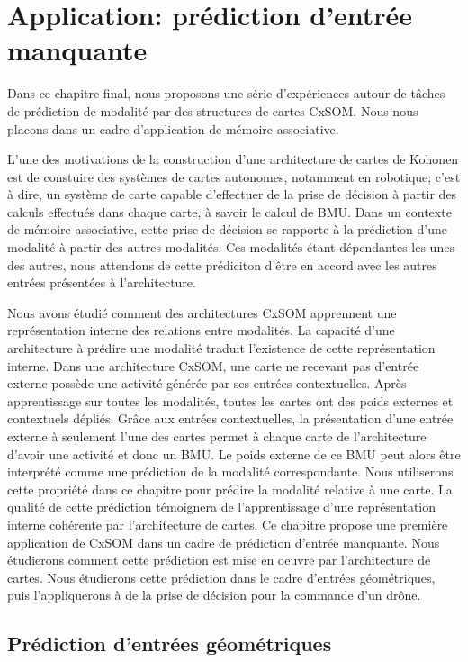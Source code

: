 \chapter{Application: prédiction d'entrée manquante}
\graphicspath{{07-Application/}}
\minitoc

Dans ce chapitre final, nous proposons une série d'expériences autour de tâches de prédiction de modalité par des structures de cartes CxSOM.
Nous nous placons dans un cadre d'application de mémoire associative.

L'une des motivations de la construction d'une architecture de cartes de Kohonen est de constuire des systèmes de cartes autonomes, notamment en robotique; c'est à dire, un système de carte capable d'effectuer de la prise de décision à partir des calculs effectués dans chaque carte, à savoir le calcul de BMU.
Dans un contexte de mémoire associative, cette prise de décision se rapporte à la prédiction d'une modalité à partir des autres modalités. Ces modalités étant dépendantes les unes des autres, nous attendons de cette prédiciton d'être en accord avec les autres entrées présentées à l'architecture.

Nous avons étudié comment des architectures CxSOM apprennent une représentation interne des relations entre modalités.
La capacité d'une architecture à prédire une modalité traduit l'existence de cette représentation interne.
Dans une architecture CxSOM, une carte ne recevant pas d'entrée externe possède une activité générée par ses entrées contextuelles.
Après apprentissage sur toutes les modalités, toutes les cartes ont des poids externes et contextuels dépliés.
Grâce aux entrées contextuelles, la présentation d'une entrée externe à seulement l'une des cartes permet à chaque carte de l'architecture d'avoir une activité et donc un BMU. Le poids externe de ce BMU peut alors être interprété comme une prédiction de la modalité correspondante.
Nous utiliserons cette propriété dans ce chapitre pour prédire la modalité relative à une carte. La qualité de cette prédiction témoignera de l'apprentissage d'une représentation interne cohérente par l'architecture de cartes. 
Ce chapitre propose une première application de CxSOM dans un cadre de prédiction d'entrée manquante. Nous étudierons comment cette prédiction est mise en oeuvre par l'architecture de cartes. Nous étudierons cette prédiction dans le cadre d'entrées géométriques, puis l'appliquerons à de la prise de décision pour la commande d'un drône.

\section{Prédiction d'entrées géométriques}

